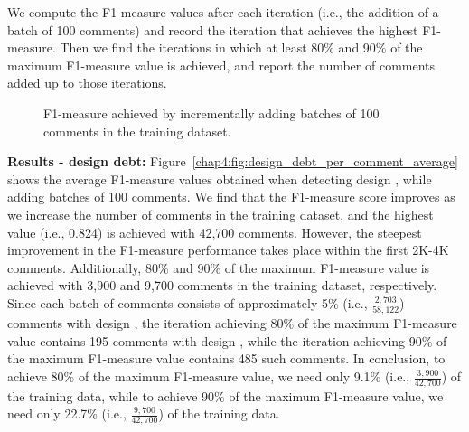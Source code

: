 We compute the F1-measure values after each iteration (i.e., the addition of a batch of 100 comments) and record the iteration that achieves the highest F1-measure. Then we find the iterations in which at least 80\% and 90\% of the maximum F1-measure value is achieved, and report the number of comments added up to those iterations.

\begin{figure}[h]
    \centering
    \caption{F1-measure achieved by incrementally adding batches of 100 comments in the training dataset.}
\end{figure}

\noindent \textbf{Results - design debt:} Figure~\ref{chap4:fig:design_debt_per_comment_average} shows the average F1-measure values obtained when detecting design \SATD, while adding batches of 100 comments. We find that the F1-measure score improves as we increase the number of comments in the training dataset, and the highest value (i.e., 0.824) is achieved with 42,700 comments. However, the steepest improvement in the F1-measure performance takes place within the first 2K-4K comments. Additionally, 80\% and 90\% of the maximum F1-measure value is achieved with 3,900 and 9,700 comments in the training dataset, respectively.
Since each batch of comments consists of approximately 5\% (i.e., $\frac{2,703}{58,122}$) comments with design \SATD, the iteration achieving 80\% of the maximum F1-measure value contains 195 comments with design \SATD,
while the iteration achieving 90\% of the maximum F1-measure value contains 485 such comments.
In conclusion, to achieve 80\% of the maximum F1-measure value, we need only 9.1\% (i.e., $\frac{3,900}{42,700}$) of the training data, while to achieve 90\% of the maximum F1-measure value, we need only 22.7\% (i.e., $\frac{9,700}{42,700}$) of the training data.

